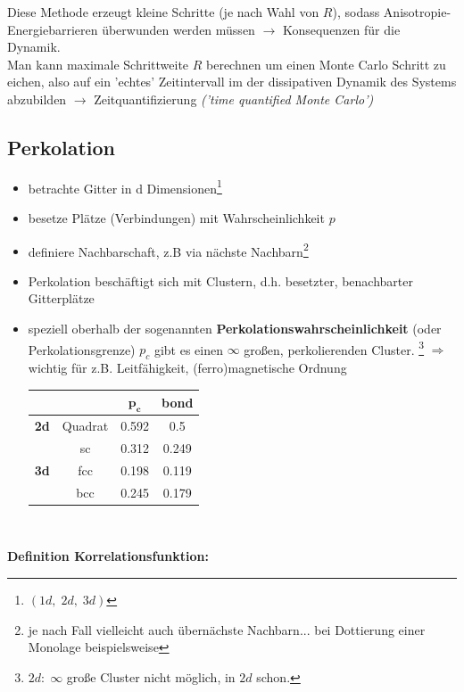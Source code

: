 \documentclass[12pt]{article}
\begin{document}
\begin{enumerate}
			
Diese Methode erzeugt kleine Schritte (je nach Wahl von $R$), sodass Anisotropie-Energiebarrieren überwunden werden müssen $\to$ Konsequenzen für die Dynamik.  \\
Man kann maximale Schrittweite $R$ berechnen um einen Monte Carlo Schritt zu eichen, also auf ein 'echtes' Zeitintervall im %
der dissipativen Dynamik des Systems abzubilden $\to$ Zeitquantifizierung \textit{('time quantified Monte Carlo')}		
\end{enumerate}


 \subsection{Perkolation}
 	\begin{itemize}
 	\item betrachte Gitter in d Dimensionen\footnote{$(1d, \; 2d, \; 3d)$}
 	\item besetze Plätze (Verbindungen) mit Wahrscheinlichkeit $p$
 	\item definiere Nachbarschaft, z.B via nächste Nachbarn\footnote{je nach Fall vielleicht auch übernächste Nachbarn... bei Dottierung einer Monolage beispielsweise}
 	\item Perkolation beschäftigt sich mit Clustern, d.h.  besetzter, benachbarter Gitterplätze %
 	\item speziell oberhalb der sogenannten \textbf{Perkolationswahrscheinlichkeit} (oder Perkolationsgrenze) $p_c$ gibt es einen $\infty$ großen, perkolierenden Cluster. \footnote{$2d: \; \infty $ große Cluster  nicht möglich, in $2d$ schon.}
 	$\Rightarrow$ wichtig für z.B. Leitfähigkeit, (ferro)magnetische Ordnung 
 	\begin{center}
 	
 	
 	\begin{tabular}{c||c c c}
 	 &  & $\mathbf{p_c}$ &\textbf{ bond} \\ 
 	\hline 
 	\textbf{2d} & Quadrat & 0.592 & 0.5 \\ 
 	 & sc & 0.312 & 0.249 \\ 
 	\textbf{3d} & fcc & 0.198 & 0.119 \\ 
 	 & bcc & 0.245 & 0.179 \\ 
 	\end{tabular} \\
 	\end{center} 
 	\end{itemize}
 	\textbf{Definition Korrelationsfunktion:}\\
\end{document}
